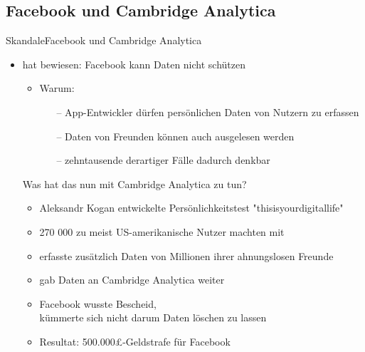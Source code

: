 \documentclass[9pt]{beamer}
\begin{document}
        \subsection{Facebook und Cambridge Analytica}
            \begin{frame}{Skandale}{Facebook und Cambridge Analytica}
                \begin{itemize}
            		\item hat bewiesen: Facebook kann Daten nicht schützen
            		\begin{itemize}
            		    \item Warum:
            		    \begin{itemize}
            		        \item[--] App-Entwickler dürfen persönlichen Daten von Nutzern zu erfassen
            		        \item[--] Daten von Freunden können auch ausgelesen werden
            		        \item[--] zehntausende derartiger Fälle dadurch denkbar
            		    \end{itemize}
            		\end{itemize}
            		\vspace{0.25cm}
            		\item[ ]Was hat das nun mit Cambridge Analytica zu tun?
            		\begin{itemize}
            		    \item  Aleksandr Kogan entwickelte Persönlichkeitstest  "thisisyourdigitallife"
            		    \item 270 000 zu meist US-amerikanische Nutzer machten mit
            		    \item erfasste zusätzlich Daten von Millionen ihrer ahnungslosen Freunde
            		    \item gab Daten an Cambridge Analytica weiter
            		    \item Facebook wusste Bescheid,\\kümmerte sich nicht darum Daten löschen zu lassen
            		    \item Resultat: 500.000£-Geldstrafe für Facebook
            		\end{itemize}
            	\end{itemize}
            \end{frame}
\end{document}
